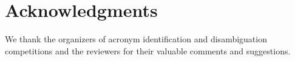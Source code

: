 \section{Acknowledgments}
\label{sec:acknowledgments}
We thank the organizers of acronym identification and disambiguation competitions and the reviewers for their valuable comments and suggestions.